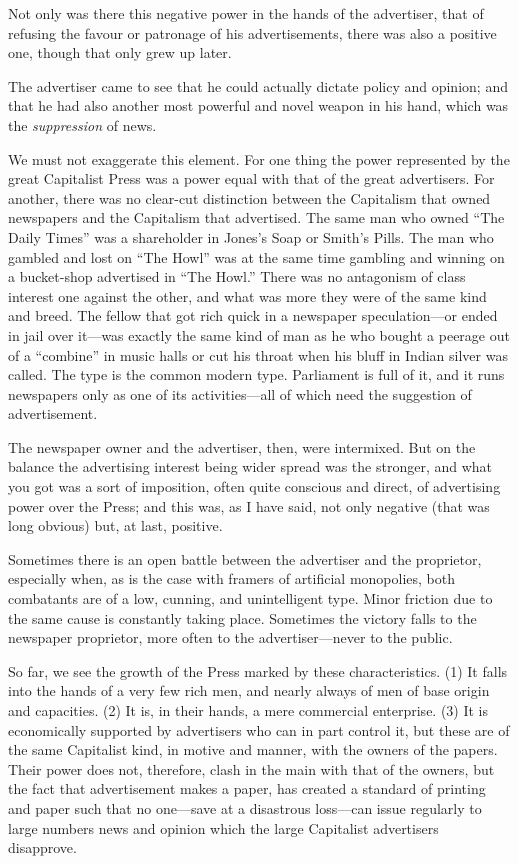\documentclass{book}
\begin{document}
Not only was there this negative power in the hands of the advertiser, that of refusing the favour or patronage of his advertisements, there was also a positive one, though that only grew up later.

The advertiser came to see that he could actually dictate policy and opinion; and that he had also another most powerful and novel weapon in his hand, which was the \emph{suppression} of news.

We must not exaggerate this element. For one thing the power represented by the great Capitalist Press was a power equal with that of the great advertisers. For another, there was no clear-cut distinction between the Capitalism that owned newspapers and the Capitalism that advertised. The same man who owned “The Daily Times” was a shareholder in Jones’s Soap or Smith’s Pills. The man who gambled and lost on “The Howl” was at the same time gambling and winning on a bucket-shop advertised in “The Howl.” There was no antagonism of class interest one against the other, and what was more they were of the same kind and breed. The fellow that got rich quick in a newspaper speculation—or ended in jail over it—was exactly the same kind of man as he who bought a peerage out of a “combine” in music halls or cut his throat when his bluff in Indian silver was called. The type is the common modern type. Parliament is full of it, and it runs newspapers only as one of its activities—all of which need the suggestion of advertisement.

The newspaper owner and the advertiser, then, were intermixed. But on the balance the advertising interest being wider spread was the stronger, and what you got was a sort of imposition, often quite conscious and direct, of advertising power over the Press; and this was, as I have said, not only negative (that was long obvious) but, at last, positive.

Sometimes there is an open battle between the advertiser and the proprietor, especially when, as is the case with framers of artificial monopolies, both combatants are of a low, cunning, and unintelligent type. Minor friction due to the same cause is constantly taking place. Sometimes the victory falls to the newspaper proprietor, more often to the advertiser—never to the public.

So far, we see the growth of the Press marked by these characteristics. (1) It falls into the hands of a very few rich men, and nearly always of men of base origin and capacities. (2) It is, in their hands, a mere commercial enterprise. (3) It is economically supported by advertisers who can in part control it, but these are of the same Capitalist kind, in motive and manner, with the owners of the papers. Their power does not, therefore, clash in the main with that of the owners, but the fact that advertisement makes a paper, has created a standard of printing and paper such that no one—save at a disastrous loss—can issue regularly to large numbers news and opinion which the large Capitalist advertisers disapprove.
\end{document}
